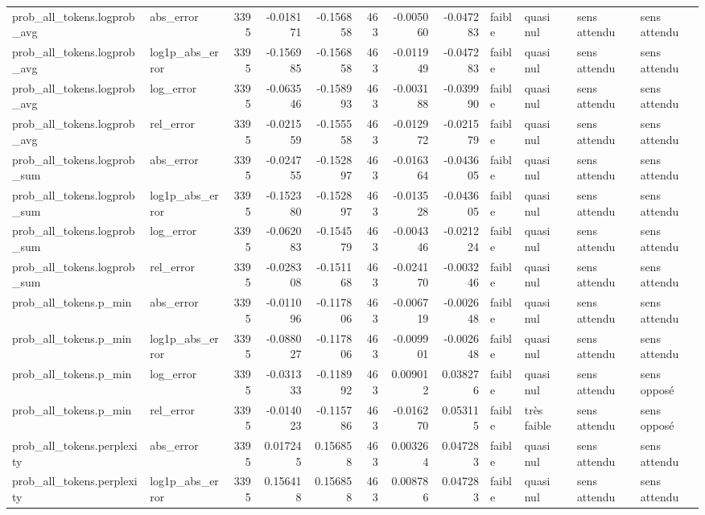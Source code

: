 \begin{longtable}{llrrrrrrllll}
prob_all_tokens.logprob_avg & abs_error & 3395 & -0.018171 & -0.156858 & 463 & -0.005060 & -0.047283 & faible & quasi nul & sens attendu & sens attendu \\
prob_all_tokens.logprob_avg & log1p_abs_error & 3395 & -0.156985 & -0.156858 & 463 & -0.011949 & -0.047283 & faible & quasi nul & sens attendu & sens attendu \\
prob_all_tokens.logprob_avg & log_error & 3395 & -0.063546 & -0.158993 & 463 & -0.003188 & -0.039990 & faible & quasi nul & sens attendu & sens attendu \\
prob_all_tokens.logprob_avg & rel_error & 3395 & -0.021559 & -0.155558 & 463 & -0.012972 & -0.021579 & faible & quasi nul & sens attendu & sens attendu \\
prob_all_tokens.logprob_sum & abs_error & 3395 & -0.024755 & -0.152897 & 463 & -0.016364 & -0.043605 & faible & quasi nul & sens attendu & sens attendu \\
prob_all_tokens.logprob_sum & log1p_abs_error & 3395 & -0.152380 & -0.152897 & 463 & -0.013528 & -0.043605 & faible & quasi nul & sens attendu & sens attendu \\
prob_all_tokens.logprob_sum & log_error & 3395 & -0.062083 & -0.154579 & 463 & -0.004346 & -0.021224 & faible & quasi nul & sens attendu & sens attendu \\
prob_all_tokens.logprob_sum & rel_error & 3395 & -0.028308 & -0.151168 & 463 & -0.024170 & -0.003246 & faible & quasi nul & sens attendu & sens attendu \\
prob_all_tokens.p_min & abs_error & 3395 & -0.011096 & -0.117806 & 463 & -0.006719 & -0.002648 & faible & quasi nul & sens attendu & sens attendu \\
prob_all_tokens.p_min & log1p_abs_error & 3395 & -0.088027 & -0.117806 & 463 & -0.009901 & -0.002648 & faible & quasi nul & sens attendu & sens attendu \\
prob_all_tokens.p_min & log_error & 3395 & -0.031333 & -0.118992 & 463 & 0.009012 & 0.038276 & faible & quasi nul & sens attendu & sens opposé \\
prob_all_tokens.p_min & rel_error & 3395 & -0.014023 & -0.115786 & 463 & -0.016270 & 0.053115 & faible & très faible & sens attendu & sens opposé \\
prob_all_tokens.perplexity & abs_error & 3395 & 0.017245 & 0.156858 & 463 & 0.003264 & 0.047283 & faible & quasi nul & sens attendu & sens attendu \\
prob_all_tokens.perplexity & log1p_abs_error & 3395 & 0.156418 & 0.156858 & 463 & 0.008786 & 0.047283 & faible & quasi nul & sens attendu & sens attendu \\

\end{longtable}
